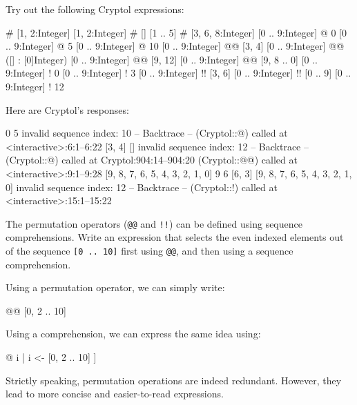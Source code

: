 
\restartrepl
\begin{Exercise}\label{ex:seq:7}
Try out the following Cryptol expressions:
\begin{replinVerb}
  [] # [1, 2:Integer]
  [1, 2:Integer] # []
  [1 .. 5] # [3, 6, 8:Integer]
  [0 .. 9:Integer] @ 0
  [0 .. 9:Integer] @ 5
  [0 .. 9:Integer] @ 10
  [0 .. 9:Integer] @@ [3, 4]
  [0 .. 9:Integer] @@ ([] : [0]Integer)
  [0 .. 9:Integer] @@ [9, 12]
  [0 .. 9:Integer] @@ [9, 8 .. 0]
  [0 .. 9:Integer] ! 0
  [0 .. 9:Integer] ! 3
  [0 .. 9:Integer] !! [3, 6]
  [0 .. 9:Integer] !! [0 .. 9]
  [0 .. 9:Integer] ! 12
\end{replinVerb}
\end{Exercise}
\begin{Answer}
Here are Cryptol's responses:
\begin{reploutVerb}
  [1, 2]
  [1, 2]
  [1, 2, 3, 4, 5, 3, 6, 8]
  0
  5
  invalid sequence index: 10
  -- Backtrace --
  (Cryptol::@) called at <interactive>:6:1--6:22
  [3, 4]
  []
  invalid sequence index: 12
   -- Backtrace --
  (Cryptol::@) called at Cryptol:904:14--904:20
  (Cryptol::@@) called at <interactive>:9:1--9:28
  [9, 8, 7, 6, 5, 4, 3, 2, 1, 0]
  9
  6
  [6, 3]
  [9, 8, 7, 6, 5, 4, 3, 2, 1, 0]
  invalid sequence index: 12
  -- Backtrace --
  (Cryptol::!) called at <interactive>:15:1--15:22
\end{reploutVerb}
\end{Answer}

\restartrepl
\begin{Exercise}\label{ex:seq:8}
  The permutation operators ({\tt @@} and {\tt !!}) can be defined
  using sequence comprehensions.  Write an expression that selects the
  even indexed elements out of the sequence \texttt{[0 ..\ 10]} first
  using {\tt @@}, and then using a sequence comprehension.
\end{Exercise}
\begin{Answer}
Using a permutation operator, we can simply write:
\begin{replinVerb}
  [0 .. 10] @@ [0, 2 .. 10]
\end{replinVerb}
Using a comprehension, we can express the same idea using:
\begin{replinVerb}
  [ [0 .. 10] @ i | i <- [0, 2 .. 10] ]
\end{replinVerb}
Strictly speaking, permutation operations are indeed redundant.
However, they lead to more concise and easier-to-read expressions.
\end{Answer}

